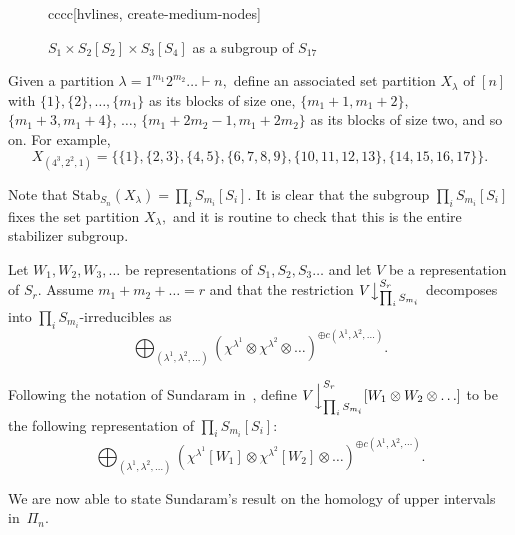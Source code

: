 \documentclass[ALCO, Unicode]{cedram}
\def\stab{\mathrm{Stab}}
\begin{document}
\begin{exam}
\begin{figure}
\begin{center}
\begin{NiceTabular}{cccc}[hvlines, create-medium-nodes]
\end{NiceTabular}
\end{center}
        \caption{$S_1 \times S_2[S_2] \times S_3[S_4]$ as a subgroup of $S_{17}$}
        \label{fig:stabx}
    \end{figure}
\end{exam}



Given a partition $\lambda = 1^{m_1}2^{m_2}\ldots \vdash n,$ define an associated set partition \textbf{$X_\lambda$} of $[n]$  with $\{1\},\{2\},\ldots, \{m_1\}$ as its blocks of size one, $\{m_1 + 1, m_1 + 2\}$, $\{m_1 + 3, m_1 + 4\}$, $\ldots$, $\{m_1 + 2m_2 - 1, m_1 + 2m_2\}$ as its blocks of size two, and so on. For example, \[X_{(4^3, 2^2, 1)} = \{ \{1\}, \{2, 3\}, \{4, 5\}, \{6, 7, 8, 9\}, \{10, 11, 12, 13\}, \{14, 15, 16, 17\}\}.\]  

Note that $\stab_{S_n}(X_\lambda) = \prod_i S_{m_i}[S_i].$ It is clear that the subgroup $\prod_i S_{m_i}[S_i]$ fixes the set partition $X_\lambda,$ and it is routine to check that this is the entire stabilizer subgroup. 

Let $W_1, W_2, W_3, \ldots$ be representations of $S_1, S_2, S_3 \ldots$ and let $V$ be a representation of $S_r.$ Assume $m_1 + m_2 + \ldots = r$ and that the restriction $V \big \downarrow^{S_r}_{\prod_{i}S_{m_i}}$ decomposes into $\prod_{i}S_{m_i}$-irreducibles as \[ \bigoplus_{(\lambda^1, \lambda ^2, \ldots)} \left(\chi^{\lambda^1} \otimes \chi^{\lambda^2} \otimes \ldots \right)^{\oplus c(\lambda^1, \lambda^2, \ldots)}.\]

Following the notation of Sundaram in~\cite{SundaramAdvances}, define \textbf{$V \Big \downarrow^{S_r}_{\prod_i S_{m_i}}[W_1 \otimes W_{2} \otimes \ldots]$} to be the following representation of $\prod_i S_{m_i}[S_i]:$\[\bigoplus_{(\lambda^1, \lambda^2, \ldots)} \left(\chi^{\lambda^1}\left[W_1\right] \otimes \chi^{\lambda^2}\left[W_2\right] \otimes \ldots \right)^{\oplus c(\lambda^1, \lambda^2, \cdots)}.\] 

We are now able  to state Sundaram's result on the homology of upper intervals in~$\Pi_n$.
\end{document}
